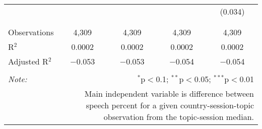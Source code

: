 \begin{table}[!htbp]
\begin{tabular}{@{\extracolsep{5pt}}lcccc}
  &  &  &  & (0.034) \\ 
  & & & & \\ 
\hline \\[-1.8ex] 
Observations & 4,309 & 4,309 & 4,309 & 4,309 \\ 
R$^{2}$ & 0.0002 & 0.0002 & 0.0002 & 0.0002 \\ 
Adjusted R$^{2}$ & $-$0.053 & $-$0.053 & $-$0.054 & $-$0.054 \\ 
\hline 
\hline \\[-1.8ex] 
\textit{Note:}  & \multicolumn{4}{r}{$^{*}$p$<$0.1; $^{**}$p$<$0.05; $^{***}$p$<$0.01} \\ 
 & \multicolumn{4}{r}{Main independent variable is difference between speech percent for a given country-session-topic observation from the topic-session median.} \\ 
\end{tabular} 
\end{table} 
